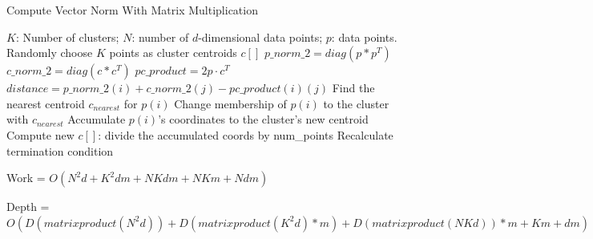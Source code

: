 \documentclass[
nopagebreaks,
style=klope,
fleqn]{powerdot}
\begin{document}
\begin{slide}{Compute Vector Norm With Matrix Multiplication}
  \scriptsize
  \begin{algorithmic}[1]
    \INPUT $K$: Number of clusters; $N$: number of $d$-dimensional data points; $p$: data points.
     \label{alg:pm2}
    \State Randomly choose $K$ points as cluster centroids $c[]$
    \State $p\_norm\_2 = diag(p * p^T)$
    \State $c\_norm\_2 = diag(c * c^T)$
    \State $pc\_product = 2 p \cdot c^T$
    \State $distance = p\_norm\_2(i) + c\_norm\_2(j) - pc\_product(i)(j)$
    \EndFor
    \State Find the nearest centroid $c_{nearest}$ for $p(i)$
    \State Change membership of $p(i)$ to the cluster with $c_{nearest}$
    \State Accumulate $p(i)$'s coordinates to the cluster's new centroid
    \EndParFor
    \State Compute new $c[]$: divide the accumulated coords by num\_points
    \State Recalculate termination condition
    \EndWhile
    \EndFunction
  \end{algorithmic}
  \vspace{.1cm}
  \begin{compactitem}
  \item{Work = $O(N^2d + K^2dm + NKdm + NKm + Ndm)$}
  \item{Depth = $O(D(matrix product(N^2d)) + D(matrix product(K^2d)*m) + D(matrix product(NKd))*m+ Km + dm)$}
  \end{compactitem}
\end{slide}
\end{document}
